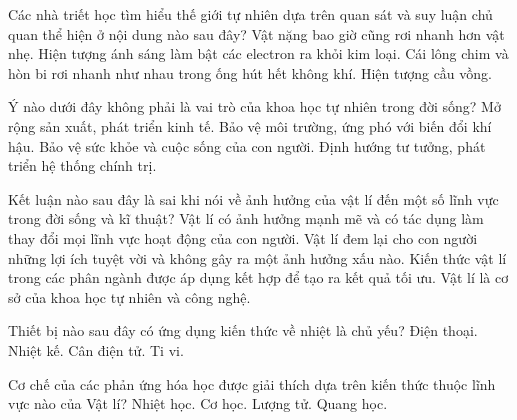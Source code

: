 \begin{ex}
Các nhà triết học tìm hiểu thế giới tự nhiên dựa trên quan sát và suy luận chủ quan thể hiện ở nội dung nào sau đây?
\choice
{\True Vật nặng bao giờ cũng rơi nhanh hơn vật nhẹ.}
{Hiện tượng ánh sáng làm bật các electron ra khỏi kim loại.}
{Cái lông chim và hòn bi rơi nhanh như nhau trong ống hút hết không khí.}
{Hiện tượng cầu vồng.}
\end{ex}

\begin{ex}
Ý nào dưới đây không phải là vai trò của khoa học tự nhiên trong đời sống?
\choice
{Mở rộng sản xuất, phát triển kinh tế.}
{Bảo vệ môi trường, ứng phó với biến đổi khí hậu.}
{Bảo vệ sức khỏe và cuộc sống của con người.}
{\True Định hướng tư tưởng, phát triển hệ thống chính trị.}
\end{ex}

\begin{ex}
Kết luận nào sau đây là sai khi nói về ảnh hưởng của vật lí đến một số lĩnh vực trong đời sống và kĩ thuật?
\choice
{Vật lí có ảnh hưởng mạnh mẽ và có tác dụng làm thay đổi mọi lĩnh vực hoạt động của con người.}
{\True Vật lí đem lại cho con người những lợi ích tuyệt vời và không gây ra một ảnh hưởng xấu nào.}
{Kiến thức vật lí trong các phân ngành được áp dụng kết hợp để tạo ra kết quả tối ưu.}
{Vật lí là cơ sở của khoa học tự nhiên và công nghệ.}
\end{ex}

\begin{ex}
Thiết bị nào sau đây có ứng dụng kiến thức về nhiệt là chủ yếu?
\choice
{Điện thoại.}
{\True Nhiệt kế.}
{Cân điện tử.}
{Ti vi.}
\end{ex}

\begin{ex}
Cơ chế của các phản ứng hóa học được giải thích dựa trên kiến thức thuộc lĩnh vực nào của Vật lí?
\choice
{Nhiệt học.}
{Cơ học.}
{\True Lượng tử.}
{Quang học.}
\end{ex}

